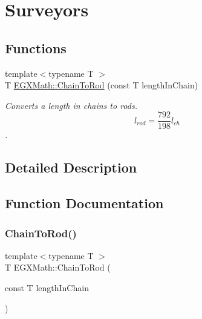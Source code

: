 \hypertarget{group___e_g_x_math-_conversions-_length_conversions-_surveyors-_chain-_surveyors}{}\section{Surveyors}
\label{group___e_g_x_math-_conversions-_length_conversions-_surveyors-_chain-_surveyors}
\subsection*{Functions}
\begin{DoxyCompactItemize}
\item 
{\footnotesize template$<$typename T $>$ }\\T \mbox{\hyperlink{group___e_g_x_math-_conversions-_length_conversions-_surveyors-_chain-_surveyors_ga9c10d6a6603fe3761923d01523c33eea}{E\+G\+X\+Math\+::\+Chain\+To\+Rod}} (const T length\+In\+Chain)
\begin{DoxyCompactList}\small\item\em Converts a length in chains to rods. \[ l_{rod}= \frac{792}{198} l_{ch} \]. \end{DoxyCompactList}\end{DoxyCompactItemize}


\subsection{Detailed Description}


\subsection{Function Documentation}
\mbox{\label{group___e_g_x_math-_conversions-_length_conversions-_surveyors-_chain-_surveyors_ga9c10d6a6603fe3761923d01523c33eea}} 
\subsubsection{\texorpdfstring{Chain\+To\+Rod()}{ChainToRod()}}
{\footnotesize\ttfamily template$<$typename T $>$ \\
T E\+G\+X\+Math\+::\+Chain\+To\+Rod (\begin{DoxyParamCaption}\item[{const T}]{length\+In\+Chain }\end{DoxyParamCaption})}



